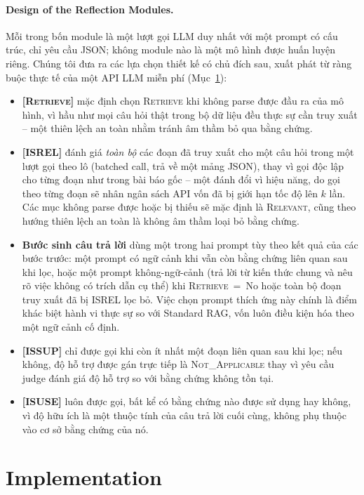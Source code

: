 \documentclass[11pt]{article}
\begin{document}
\paragraph{Design of the Reflection Modules.} Mỗi trong bốn module là một lượt gọi LLM duy nhất với một prompt có cấu trúc, chỉ yêu cầu JSON; không module nào là một mô hình được huấn luyện riêng. Chúng tôi đưa ra các lựa chọn thiết kế có chủ đích sau, xuất phát từ ràng buộc thực tế của một API LLM miễn phí (Mục~\ref{sec:impl}):

\begin{itemize}[leftmargin=*]
\item \textbf{[\textsc{Retrieve}]} mặc định chọn \textsc{Retrieve} khi không parse được đầu ra của mô hình, vì hầu như mọi câu hỏi thật trong bộ dữ liệu đều thực sự cần truy xuất -- một thiên lệch an toàn nhằm tránh âm thầm bỏ qua bằng chứng.
\item \textbf{[\textsc{ISREL}]} đánh giá \emph{toàn bộ} các đoạn đã truy xuất cho một câu hỏi trong một lượt gọi theo lô (batched call, trả về một mảng JSON), thay vì gọi độc lập cho từng đoạn như trong bài báo gốc -- một đánh đổi vì hiệu năng, do gọi theo từng đoạn sẽ nhân ngân sách API vốn đã bị giới hạn tốc độ lên $k$ lần. Các mục không parse được hoặc bị thiếu sẽ mặc định là \textsc{Relevant}, cũng theo hướng thiên lệch an toàn là không âm thầm loại bỏ bằng chứng.
\item \textbf{Bước sinh câu trả lời} dùng một trong hai prompt tùy theo kết quả của các bước trước: một prompt có ngữ cảnh khi vẫn còn bằng chứng liên quan sau khi lọc, hoặc một prompt không-ngữ-cảnh (trả lời từ kiến thức chung và nêu rõ việc không có trích dẫn cụ thể) khi \textsc{Retrieve}~=~No hoặc toàn bộ đoạn truy xuất đã bị \textsc{ISREL} lọc bỏ. Việc chọn prompt thích ứng này chính là điểm khác biệt hành vi thực sự so với Standard RAG, vốn luôn điều kiện hóa theo một ngữ cảnh cố định.
\item \textbf{[\textsc{ISSUP}]} chỉ được gọi khi còn ít nhất một đoạn liên quan sau khi lọc; nếu không, độ hỗ trợ được gán trực tiếp là \textsc{Not\_Applicable} thay vì yêu cầu judge đánh giá độ hỗ trợ so với bằng chứng không tồn tại.
\item \textbf{[\textsc{ISUSE}]} luôn được gọi, bất kể có bằng chứng nào được sử dụng hay không, vì độ hữu ích là một thuộc tính của câu trả lời cuối cùng, không phụ thuộc vào cơ sở bằng chứng của nó.
\end{itemize}

\section{Implementation}
\label{sec:impl}
\end{document}
